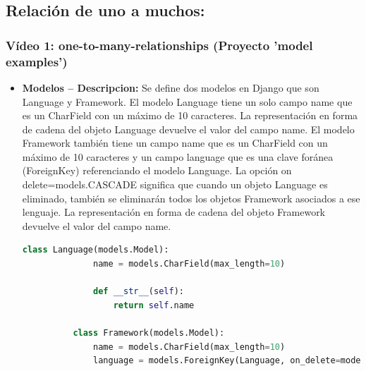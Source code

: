 \documentclass{article}
\begin{document}

  \subsection{Relación de uno a muchos: }
  

  \subsubsection{Vídeo 1: one-to-many-relationships (Proyecto 'model examples')}
    \begin{itemize}
      \item \textbf{Modelos -- Descripcion: }Se define dos modelos en Django que son Language y Framework. 
        El modelo Language tiene un solo campo name que es un CharField con un máximo de 10 caracteres. 
        La representación en forma de cadena del objeto Language devuelve el valor del campo name. El modelo 
        Framework también tiene un campo name que es un CharField con un máximo de 10 caracteres y un campo 
        language que es una clave foránea (ForeignKey) referenciando el modelo Language. La opción on delete=models.CASCADE 
        significa que cuando un objeto Language es eliminado, también se eliminarán todos los objetos Framework asociados a 
        ese lenguaje. La representación en forma de cadena del objeto Framework devuelve el valor del campo name.
        \begin{lstlisting}[language=Python]
          class Language(models.Model):
              name = models.CharField(max_length=10)
              
              def __str__(self):
                  return self.name
              
          class Framework(models.Model):
              name = models.CharField(max_length=10)
              language = models.ForeignKey(Language, on_delete=models.CASCADE)
              

\end{lstlisting}
\end{itemize}
\end{document}
